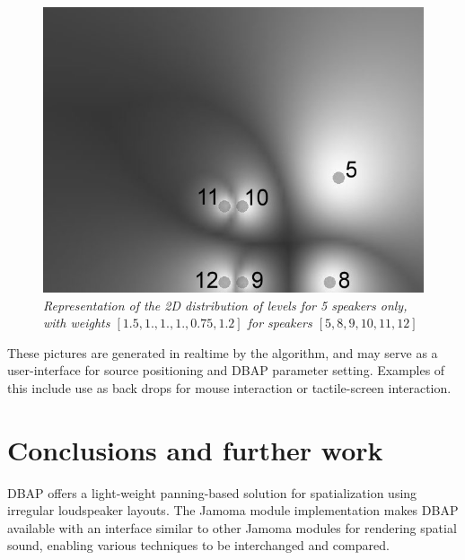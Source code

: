 \documentclass[twoside,10pt]{article}
\begin{document}
\begin{figure}[ht]
\centerline{\includegraphics[scale=0.5]{spk_groups+nbrs}}
\caption{{\it Representation of the 2D distribution of levels for 5 speakers only, with weights $[1.5,1.,1.,1.,0.75,1.2]$ for speakers $[5,8,9,10,11,12]$}}  
\label{fig:5spk_weights}
\end{figure}
These pictures are generated in realtime by the algorithm, and may serve as a user-interface for source positioning and DBAP parameter setting.  Examples of this include use as back drops for mouse interaction or tactile-screen interaction.


\section{Conclusions and further work}

DBAP offers a light-weight panning-based solution for spatialization using irregular loudspeaker layouts. The Jamoma module implementation makes DBAP available with an interface similar to other Jamoma modules for rendering spatial sound, enabling various techniques to be interchanged and compared. %
\end{document}

